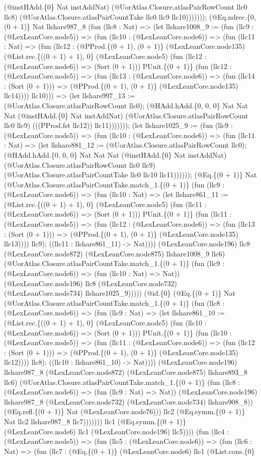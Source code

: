 \documentclass[11pt]{article}
\begin{document}
(@instHAdd.\{0\} Nat instAddNat) (@UorAtlas.Closure.atlasPairRowCount llc0 llc8) (@UorAtlas.Closure.atlasPairCountTake llc0 llc9 llc10))))))); (@Eq.ndrec.\{0, (0 + 1)\} Nat llshare987\_8 (fun (llc8 : Nat) => (let llshare1008\_9 := (fun (llc9 : (@LexLeanCore.node5)) => (fun (llc10 : (@LexLeanCore.node6)) => (fun (llc11 : Nat) => (fun (llc12 : (@PProd.\{(0 + 1), (0 + 1)\} (@LexLeanCore.node135) (@List.rec.\{((0 + 1) + 1), 0\} (@LexLeanCore.node5) (fun (llc12 : (@LexLeanCore.node6)) => (Sort (0 + 1))) PUnit.\{(0 + 1)\} (fun (llc12 : (@LexLeanCore.node5)) => (fun (llc13 : (@LexLeanCore.node6)) => (fun (llc14 : (Sort (0 + 1))) => (@PProd.\{(0 + 1), (0 + 1)\} (@LexLeanCore.node135) llc14)))) llc10))) => (let llshare997\_13 := (@UorAtlas.Closure.atlasPairRowCount llc0); (@HAdd.hAdd.\{0, 0, 0\} Nat Nat Nat (@instHAdd.\{0\} Nat instAddNat) (@UorAtlas.Closure.atlasPairRowCount llc0 llc9) (((PProd.fst llc12)) llc11))))))); (let llshare1025\_9 := (fun (llc9 : (@LexLeanCore.node5)) => (fun (llc10 : (@LexLeanCore.node6)) => (fun (llc11 : Nat) => (let llshare881\_12 := (@UorAtlas.Closure.atlasPairRowCount llc0); (@HAdd.hAdd.\{0, 0, 0\} Nat Nat Nat (@instHAdd.\{0\} Nat instAddNat) (@UorAtlas.Closure.atlasPairRowCount llc0 llc9) (@UorAtlas.Closure.atlasPairCountTake llc0 llc10 llc11)))))); (@Eq.\{(0 + 1)\} Nat (@UorAtlas.Closure.atlasPairCountTake.match\_1.\{(0 + 1)\} (fun (llc9 : (@LexLeanCore.node6)) => (fun (llc10 : Nat) => (let llshare861\_11 := (@List.rec.\{((0 + 1) + 1), 0\} (@LexLeanCore.node5) (fun (llc11 : (@LexLeanCore.node6)) => (Sort (0 + 1))) PUnit.\{(0 + 1)\} (fun (llc11 : (@LexLeanCore.node5)) => (fun (llc12 : (@LexLeanCore.node6)) => (fun (llc13 : (Sort (0 + 1))) => (@PProd.\{(0 + 1), (0 + 1)\} (@LexLeanCore.node135) llc13)))) llc9); ((llc11 : llshare861\_11) -> Nat)))) (@LexLeanCore.node196) llc8 (@LexLeanCore.node872) (@LexLeanCore.node875) llshare1008\_9 llc6) (@UorAtlas.Closure.atlasPairCountTake.match\_1.\{(0 + 1)\} (fun (llc9 : (@LexLeanCore.node6)) => (fun (llc10 : Nat) => Nat)) (@LexLeanCore.node196) llc8 (@LexLeanCore.node732) (@LexLeanCore.node734) llshare1025\_9))))) (@id.\{0\} (@Eq.\{(0 + 1)\} Nat (@UorAtlas.Closure.atlasPairCountTake.match\_1.\{(0 + 1)\} (fun (llc8 : (@LexLeanCore.node6)) => (fun (llc9 : Nat) => (let llshare861\_10 := (@List.rec.\{((0 + 1) + 1), 0\} (@LexLeanCore.node5) (fun (llc10 : (@LexLeanCore.node6)) => (Sort (0 + 1))) PUnit.\{(0 + 1)\} (fun (llc10 : (@LexLeanCore.node5)) => (fun (llc11 : (@LexLeanCore.node6)) => (fun (llc12 : (Sort (0 + 1))) => (@PProd.\{(0 + 1), (0 + 1)\} (@LexLeanCore.node135) llc12)))) llc8); ((llc10 : llshare861\_10) -> Nat)))) (@LexLeanCore.node196) llshare987\_8 (@LexLeanCore.node872) (@LexLeanCore.node875) llshare893\_8 llc6) (@UorAtlas.Closure.atlasPairCountTake.match\_1.\{(0 + 1)\} (fun (llc8 : (@LexLeanCore.node6)) => (fun (llc9 : Nat) => Nat)) (@LexLeanCore.node196) llshare987\_8 (@LexLeanCore.node732) (@LexLeanCore.node734) llshare908\_8)) (@Eq.refl.\{(0 + 1)\} Nat (@LexLeanCore.node76))) llc2 (@Eq.symm.\{(0 + 1)\} Nat llc2 llshare987\_8 llc7))))))) llc1 (@Eq.symm.\{(0 + 1)\} (@LexLeanCore.node6) llc1 (@LexLeanCore.node196) llc5)))) (fun (llc4 : (@LexLeanCore.node5)) => (fun (llc5 : (@LexLeanCore.node6)) => (fun (llc6 : Nat) => (fun (llc7 : (@Eq.\{(0 + 1)\} (@LexLeanCore.node6) llc1 (@List.cons.\{0\} 
\end{document}

